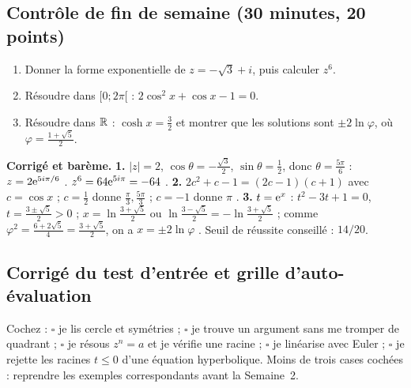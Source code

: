 \subsection{Contrôle de fin de semaine (30 minutes, 20 points)}
\begin{enumerate}
 \item {} Donner la forme exponentielle de $z=-\sqrt3+i$, puis calculer $z^6$.
 \item {} Résoudre dans $[0;2\pi[$ : $2\cos^2x+\cos x-1=0$.
 \item {} Résoudre dans $\mathbb{R}$ : $\cosh x=\frac32$ et montrer que les solutions sont $\pm2\ln\varphi$, où $\varphi=\frac{1+\sqrt5}2$.
\end{enumerate}
\ifcorr
\textbf{Corrigé et barème.}
\textbf{1.} $|z|=2$, $\cos\theta=-\frac{\sqrt3}2$, $\sin\theta=\frac12$, donc $\theta=\frac{5\pi}6$ : $z=2\mathrm{e}^{5i\pi/6}$ . $z^6=64\mathrm{e}^{5i\pi}=-64$ . \textbf{2.} $2c^2+c-1=(2c-1)(c+1)$ avec $c=\cos x$  ; $c=\frac12$ donne $\frac\pi3,\frac{5\pi}3$ ; $c=-1$ donne $\pi$ . \textbf{3.} $t=\mathrm{e}^x$ : $t^2-3t+1=0$, $t=\frac{3\pm\sqrt5}2>0$  ; $x=\ln\frac{3+\sqrt5}2$ ou $\ln\frac{3-\sqrt5}2=-\ln\frac{3+\sqrt5}2$ ; comme $\varphi^2=\frac{6+2\sqrt5}4=\frac{3+\sqrt5}2$, on a $x=\pm2\ln\varphi$ . Seuil de réussite conseillé : $14/20$.
\fi

\subsection{Corrigé du test d'entrée et grille d'auto-évaluation}
Cochez : $\square$ je lis cercle et symétries ; $\square$ je trouve un argument sans me tromper de quadrant ; $\square$ je résous $z^n=a$ et je vérifie une racine ; $\square$ je linéarise avec Euler ; $\square$ je rejette les racines $t\le0$ d'une équation hyperbolique. Moins de trois cases cochées : reprendre les exemples correspondants avant la Semaine~2.
